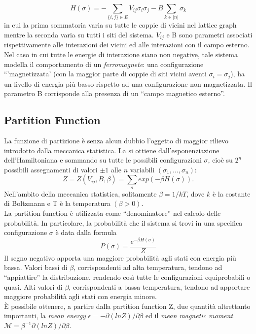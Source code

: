 \begin{equation}
H(\sigma) = - \sum_{\lbrace i,j \rbrace \in E}{V_{ij}\sigma_i\sigma_j} - B \sum_{k\in\lbrack n \rbrack}{\sigma_k}
\end{equation}
in cui la prima sommatoria varia su tutte le coppie di vicini nel lattice graph mentre la seconda varia su tutti i siti del sistema. $V_{ij}$ e B sono parametri associati rispettivamente alle interazioni dei vicini ed alle interazioni con il campo esterno.\\
Nel caso in cui tutte le energie di interazione siano non negative, tale sistema modella il comportamento di un \textit{ferromagnete}: una configurazione ``'magnetizzata' (con la maggior parte di coppie di siti vicini aventi $\sigma_i = \sigma_j$), ha un livello di energia più basso rispetto ad una configurazione non magnetizzata. Il parametro B corrisponde alla presenza di un ``campo magnetico esterno''.
\subsection{Partition Function}
La funzione di partizione è senza alcun dubbio l'oggetto di maggior rilievo introdotto dalla meccanica statistica. La si ottiene dall'esponenziazione dell'Hamiltoniana e sommando su tutte le possibili configurazioni $\sigma$, cioè su $2^n$ possibili assegnamenti di valori $\pm1$ alle $n$ variabili $(\sigma_1, \dots, \sigma_n)$:
\begin{equation}
	Z = Z(V_{ij}, B, \beta) = \sum_{\sigma}{exp(-\beta H(\sigma))}.
\end{equation}
Nell'ambito della meccanica statistica, solitamente $\beta = 1 / kT$, dove $k$ è la costante di Boltzmann e T è la temperatura $(\beta > 0)$.\\
La partition function è utilizzata come ``denominatore'' nel calcolo delle probabilità. In particolare, la probabilità che il sistema si trovi in una specifica configurazione $\sigma$ è data dalla formula
\begin{equation}
	P(\sigma) = \frac{e^{-\beta H(\sigma)}}{Z}
\end{equation}
Il segno negativo apporta una maggiore probabilità agli stati con energia più bassa. Valori bassi di $\beta$, corrispondenti ad alta temperatura, tendono ad ``appiattire'' la distribuzione, rendendo così tutte le configurazioni equiprobabili o quasi. Alti valori di $\beta$, corrispondenti a bassa temperatura, tendono ad apportare maggiore probabilità agli stati con energia minore.\\
È possibile ottenere, a partire dalla partition function Z, due quantità altrettanto importanti, la \textit{mean energy} $\epsilon = -\partial(ln Z)/\partial\beta$ ed il \textit{mean magnetic moment} $\mathcal{M} = \beta^{-1}\partial(ln Z)/\partial\beta$.
